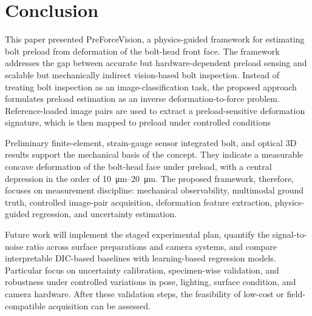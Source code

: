 \section{Conclusion}
This paper presented PreForceVision, a physics-guided framework for estimating bolt preload from deformation of the bolt-head front face. The framework addresses the gap between accurate but hardware-dependent preload sensing and scalable but mechanically indirect vision-based bolt inspection. Instead of treating bolt inspection as an image-classification task, the proposed approach formulates preload estimation as an inverse deformation-to-force problem. Reference-loaded image pairs are used to extract a preload-sensitive deformation signature, which is then mapped to preload under controlled conditions

Preliminary finite-element, strain-gauge sensor integrated bolt, and optical 3D results support the mechanical basis of the concept. They indicate a measurable concave deformation of the bolt-head face under preload, with a central depression in the order of \SIrange{10}{20}{\micro\meter}. The proposed framework, therefore, focuses on measurement discipline: mechanical observability, multimodal ground truth, controlled image-pair acquisition, deformation feature extraction, physics-guided regression, and uncertainty estimation.

Future work will implement the staged experimental plan, quantify the signal-to-noise ratio across surface preparations and camera systems, and compare interpretable DIC-based baselines with learning-based regression models. Particular focus on uncertainty calibration, specimen-wise validation, and robustness under controlled variations in pose, lighting, surface condition, and camera hardware. After these validation steps, the feasibility of low-cost or field-compatible acquisition can be assessed.